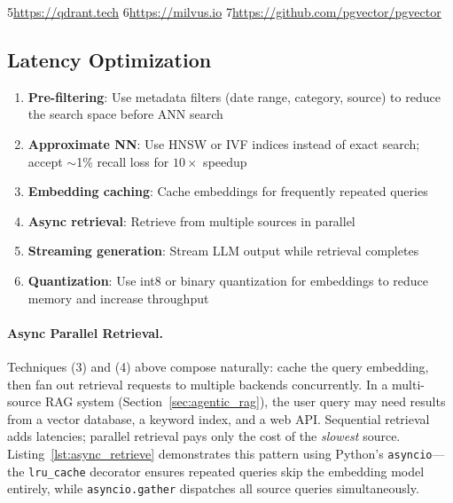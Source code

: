 5\href{https://qdrant.tech}{https://qdrant.tech} 6\href{https://milvus.io}{https://milvus.io} 7\href{https://github.com/pgvector/pgvector}{https://github.com/pgvector/pgvector} 

\subsection{Latency Optimization}
\label{latency-optimization}

\begin{enumerate}
  \item \textbf{Pre-filtering}: Use metadata filters (date range, category, source) to reduce the search space before ANN search
  \item \textbf{Approximate NN}: Use HNSW or IVF indices instead of exact search; accept $\sim$1\% recall loss for $10\times$ speedup
  \item \textbf{Embedding caching}: Cache embeddings for frequently repeated queries
  \item \textbf{Async retrieval}: Retrieve from multiple sources in parallel
  \item \textbf{Streaming generation}: Stream LLM output while retrieval completes
  \item \textbf{Quantization}: Use int8 or binary quantization for embeddings to reduce memory and increase throughput
\end{enumerate}

\paragraph{Async Parallel Retrieval.}
\label{async-parallel-retrieval.}

Techniques (3) and (4) above compose naturally: cache the query embedding, then fan out retrieval requests to multiple backends concurrently. In a multi-source RAG system (Section~\ref{sec:agentic_rag}), the user query may need results from a vector database, a keyword index, and a web API. Sequential retrieval adds latencies; parallel retrieval pays only the cost of the \emph{slowest} source. Listing~\ref{lst:async_retrieve} demonstrates this pattern using Python’s \texttt{asyncio}---the \texttt{lru\_cache} decorator ensures repeated queries skip the embedding model entirely, while \texttt{asyncio.gather} dispatches all source queries simultaneously.

